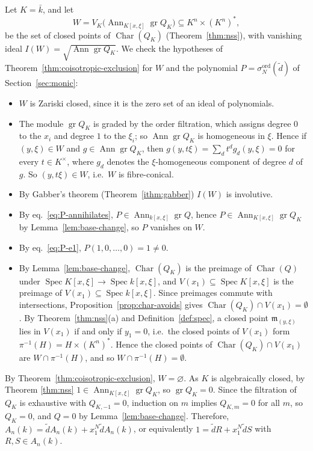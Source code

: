 \documentclass[pdflatex,sn-mathphys-num]{sn-jnl}
\numberwithin{equation}{section}
\theoremstyle{thmstyleone}
\theoremstyle{thmstyletwo}
\newcommand{\ord}{\operatorname{ord}}
\newcommand{\gr}{\operatorname{gr}}
\newcommand{\Ann}{\operatorname{Ann}}
\begin{document}
Let $K=\bar k$, and let
\[W = V_K\bigl(\operatorname{Ann}_{K[x,\xi]}\operatorname{gr}Q_K\bigr)\subseteq K^n\times (K^n)^*,\]
be the set of closed points of $\operatorname{Char}(Q_K)$ (Theorem~\ref{thm:nss}),
with vanishing ideal $I(W)=\sqrt{\operatorname{Ann}\operatorname{gr}Q_K}$.
We check
the hypotheses of Theorem~\ref{thm:coisotropic-exclusion} for $W$ and the
polynomial $P=\sigma^{\mathrm{\ord}}_N(\tilde d)$ of Section~\ref{sec:monic}:

\begin{itemize}
\item $W$ is Zariski closed, since it is the zero set of an ideal of polynomials.
\item The module $\gr Q_K$ is graded by the order filtration, which assigns degree
$0$ to the $x_i$ and degree $1$ to the $\xi_i$; so $\Ann\gr Q_K$  is homogeneous in $\xi$. Hence if $(y,\xi)\in W$
and $g\in\Ann\gr Q_K$, then $g(y,t\xi)=\sum_dt^dg_d(y,\xi)=0$ for every
$t\in K^\times$, where $g_d$ denotes the $\xi$-homogeneous component of degree $d$ of $g$. So
$(y,t\xi)\in W$, i.e.\ $W$ is fibre-conical.
\item By Gabber's theorem (Theorem~\ref{ithm:gabber}) $I(W)$ is involutive. 
\item By eq.~\eqref{eq:P-annihilates}, $P\in
\Ann_{k[x,\xi]}\gr Q$, hence $P\in\Ann_{K[x,\xi]}\gr Q_K$ by
Lemma~\ref{lem:base-change}, so $P$ vanishes on $W$.
\item By eq.~\eqref{eq:P-e1}, $P(1,0,\dots,0)=1\neq 0$.
\item  By Lemma~\ref{lem:base-change}, $\operatorname{Char}(Q_K)$ is the preimage of
  $\operatorname{Char}(Q)$ under $\operatorname{Spec}K[x,\xi]\to\operatorname{Spec}k[x,\xi]$,
  and $V(x_1)\subseteq\operatorname{Spec}K[x,\xi]$ is the preimage of
  $V(x_1)\subseteq\operatorname{Spec}k[x,\xi]$. Since preimages commute with
  intersections, Proposition~\ref{prop:char-avoids} gives
  $\operatorname{Char}(Q_K)\cap V(x_1)=\emptyset$. By Theorem~\ref{thm:nss}(a) and Definition~\ref{def:spec}, a closed point $\mathfrak m_{(y,\xi)}$ lies in $V(x_1)$ if and only if $y_1=0$, i.e.\ the closed points of $V(x_1)$ form $\pi^{-1}(H)=H\times(K^n)^*$. Hence the closed points of $\operatorname{Char}(Q_K)\cap V(x_1)$ are $W\cap\pi^{-1}(H)$, and so $W\cap\pi^{-1}(H)=\emptyset$.
\end{itemize}
By Theorem~\ref{thm:coisotropic-exclusion}, $W=\varnothing$. As $K$ is
algebraically closed, by Theorem \ref{thm:nss}  $1 \in \Ann_{K[x,\xi]}\gr Q_K$,
so $\gr Q_K=0$. Since the filtration of $Q_K$ is exhaustive with $Q_{K,-1}=0$,
induction on $m$ implies $Q_{K,m}=0$ for all $m$, so $Q_K=0$, and
$Q=0$ by Lemma~\ref{lem:base-change}. Therefore, $A_n(k) = \tilde dA_n(k) + x_1^N\tilde dA_n(k)$, or equivalently $1=\tilde dR+x_1^N\tilde dS$
with $R,S\in A_n(k)$.
\end{document}
